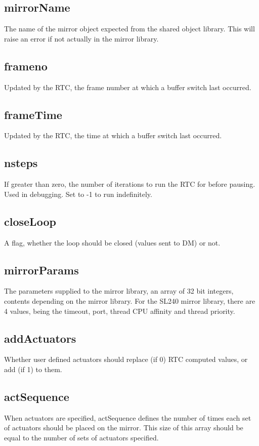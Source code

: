 \documentclass[a4,10pt]{article}
\begin{document}
\subsection{mirrorName}
The name of the mirror object expected from the shared object library.
This will raise an error if not actually in the mirror library.

\subsection{frameno}
Updated by the RTC, the frame number at which a buffer switch last
occurred.

\subsection{frameTime}
Updated by the RTC, the time at which a buffer switch last occurred.

\subsection{nsteps}
If greater than zero, the number of iterations to run the RTC for
before pausing.  Used in debugging.  Set to -1 to run indefinitely.

\subsection{closeLoop}
A flag, whether the loop should be closed (values sent to DM) or not.

\subsection{mirrorParams}
The parameters supplied to the mirror library, an array of 32 bit
integers, contents depending on the mirror library.  For the SL240
mirror library, there are 4 values, being the timeout, port, thread
CPU affinity and thread priority.

\subsection{addActuators}
Whether user defined actuators should replace (if 0) RTC computed
values, or add (if 1) to them.

\subsection{actSequence}
When actuators are specified, actSequence defines the number of times
each set of actuators should be placed on the mirror.  This size of
this array should be equal to the number of sets of actuators
specified.
\end{document}
